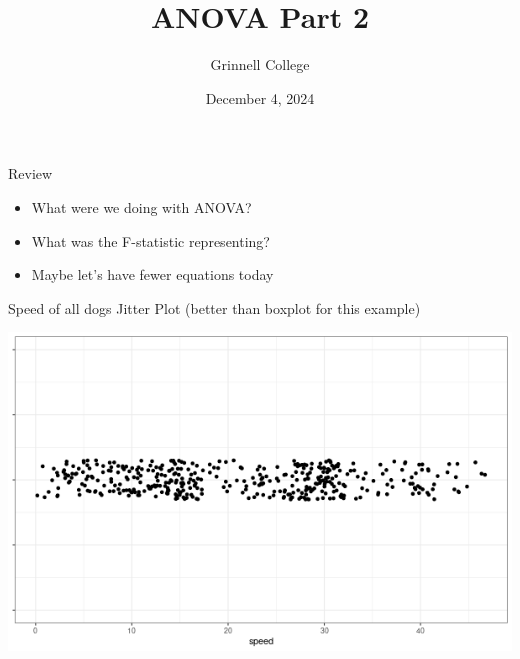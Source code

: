 \documentclass{beamer}
\title[STA 209]{ANOVA Part 2}
\subtitle{}
\author{Grinnell College}
\date{December 4, 2024}
\begin{document}
\begin{frame}
  \titlepage
\end{frame}

\begin{frame}{Review}

\begin{itemize}
\item What were we doing with ANOVA?
\item What was the F-statistic representing?
\item Maybe let's have fewer equations today

\end{itemize}


\end{frame}


\begin{frame}{Speed of all dogs}
Jitter Plot (better than boxplot for this example)
\begin{center}
\includegraphics[scale=0.45]{all_dog_speed.png}
\end{center}
\end{frame}
\end{document}
